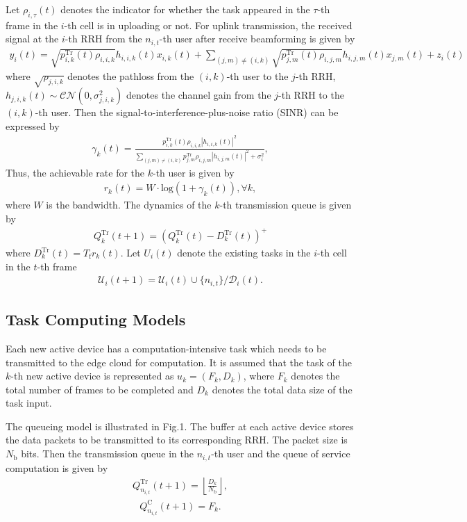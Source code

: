 Let $\rho_{i,\tau}(t)$ denotes the indicator for whether the task appeared in the $\tau$-th frame in the $i$-th cell is in uploading or not.
For uplink transmission, the received signal at the $i$-th RRH from the $n_{i,t}$-th user after receive beamforming is given by
\begin{align}
	y_{i}(t) = \sqrt{p_{i,k}^{\mathrm{Tr}}(t)\rho_{i,i,k}}h_{i,i,k}(t)x_{i,k}(t)+\sum_{(j,m)\neq (i,k)}\sqrt{p_{j,m}^{\mathrm{Tr}}(t)\rho_{i,j,m}}h_{i,j,m}(t)x_{j,m}(t)+z_{i}(t)
\end{align}
where $\sqrt{\rho_{j,i,k}}$ denotes the pathloss from the $(i,k)$-th user to the $j$-th RRH, $h_{j,i,k}(t)\sim \mathcal{CN}(0,\sigma_{j,i,k}^{2})$ denotes the channel gain from the $j$-th RRH to the $(i,k)$-th user.
Then the signal-to-interference-plus-noise ratio (SINR) can be expressed by
\begin{align}
	\gamma_{k}(t)=\frac{p_{i,k}^{\mathrm{Tr}}(t)\rho_{i,i,k}|h_{i,i,k}(t)|^2}{\sum_{(j,m)\neq (i,k)}p_{j,m}^{\mathrm{Tr}}\rho_{i,j,m}|h_{i,j,m}(t)|^{2}+\sigma_{i}^{2}},
\end{align}
Thus, the achievable rate for the $k$-th user is given by
\begin{align}
	r_{k}(t)= W\cdot \text{log}(1+\gamma_{k}(t)), \forall k,
\end{align}
where $W$ is the bandwidth.
The dynamics of the $k$-th transmission queue is given by
\begin{align}
	Q_{k}^{\mathrm{Tr}}(t+1)=(Q_{k}^{\mathrm{Tr}}(t)-D_{k}^{\mathrm{Tr}}(t))^{+}
\end{align}
where $D_{k}^{\mathrm{Tr}}(t)=T_{\mathrm{f}}r_{k}(t)$.
Let ${U}_{i}(t)$ denote the existing tasks in the $i$-th cell in the $t$-th frame
\begin{align}
	\mathcal{U}_{i}(t+1)= \mathcal{U}_{i}(t)\cup\{n_{i,t}\}/\mathcal{D}_{i}(t).
\end{align}

\subsection{Task Computing Models}
Each new active device has a computation-intensive task which needs to be transmitted to the edge cloud for computation. It is assumed that the task of the $k$-th new active device is represented as $u_{k}=(F_{k},D_{k})$, where $F_{k}$ denotes the total number of frames to be completed and $D_{k}$ denotes the total data size of the task input.

The queueing model is illustrated in Fig.1.
The buffer at each active device stores the data packets to be transmitted to its corresponding RRH. The packet size is ${N_\mathrm{b}}$ bits. Then the transmission queue in the $n_{i,t}$-th user and the queue of service computation is given by
\begin{align}
	Q_{n_{i,t}}^{\mathrm{Tr}}(t+1)=\left\lfloor\frac{D_{k}}{N_\mathrm{b}}\right\rfloor,
\end{align}
\begin{align}
	Q_{n_{i,t}}^{\mathrm{C}}(t+1)=F_{k}.
\end{align}

